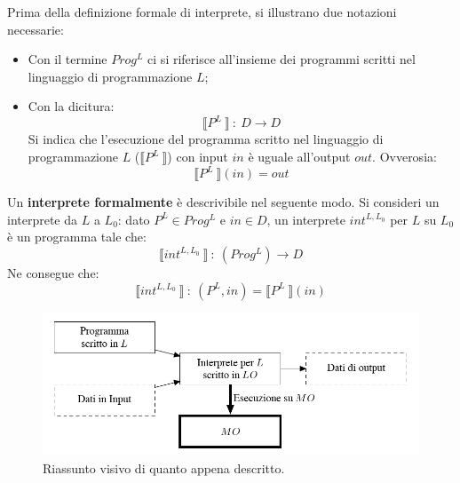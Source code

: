 \documentclass[a4paper]{article}
\newcommand{\exec}[1]{\llbracket #1\:\rrbracket}
\begin{document}
	\noindent
	Prima della definizione formale di interprete, si illustrano due notazioni necessarie:
	\begin{itemize}
		\item Con il termine $Prog^{L}$ ci si riferisce all'insieme dei programmi scritti nel linguaggio di programmazione $L$;
		
		\item Con la dicitura:
		\begin{equation*}
			\exec{P^{L}} \: : \: D \rightarrow D
		\end{equation*}
		Si indica che l'esecuzione del programma scritto nel linguaggio di programmazione $L$ ($\exec{P^{L}}$) con input $in$ è uguale all'output $out$. Ovverosia:
		\begin{equation*}
			\exec{P^{L}}\left(in\right) = out	
		\end{equation*}
	\end{itemize}
	Un \textbf{interprete formalmente} è descrivibile nel seguente modo. Si consideri un interprete da $L$ a $L_{0}$: dato $P^{L} \in Prog^{L}$ e $in \in D$, un interprete $int^{L, L_{0}}$ per $L$ su $L_{0}$ è un programma tale che:
	\begin{equation*}
		\exec{int^{L, L_{0}}} \: : \: \left(Prog^{L}\right) \rightarrow D
	\end{equation*}
	Ne consegue che:
	\begin{equation*}
		\exec{int^{L, L_{0}}} \: : \: \left(P^{L}, in\right) = \exec{P^{L}}\left(in\right)
	\end{equation*}
	\begin{figure}[!htp]
		\centering
		\includegraphics[width=\textwidth]{img/ex1-1.png}
		\caption*{Riassunto visivo di quanto appena descritto.}
	\end{figure}\newpage
	
\end{document}
